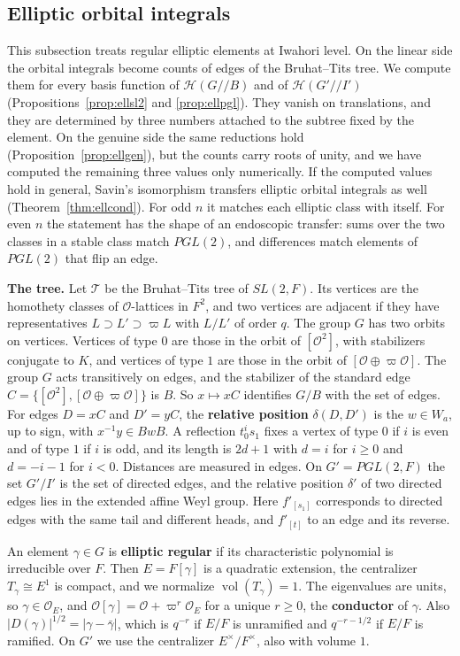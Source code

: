 \documentclass[12pt,letterpaper]{amsart}
\numberwithin{equation}{section}
\theoremstyle{definition}
\theoremstyle{remark}
\DeclareMathOperator{\vol}{vol}
\newcommand{\cO}{\mathcal{O}}
\newcommand{\cH}{\mathcal{H}}
\begin{document}
\subsection{Elliptic orbital integrals}
\label{subsec:elliptic}
This subsection treats regular elliptic elements at Iwahori level. On
the linear side the orbital integrals become counts of edges of the
Bruhat--Tits tree. We compute them for every basis function of
$\cH(G/\!/B)$ and of $\cH(G'/\!/I')$
(Propositions~\ref{prop:ellsl2} and \ref{prop:ellpgl}). They vanish on
translations, and they are determined by three numbers attached to the
subtree fixed by the element. On the genuine side the same reductions
hold (Proposition~\ref{prop:ellgen}), but the counts carry roots of
unity, and we have computed the remaining three values only
numerically. If the computed values hold in general, Savin's
isomorphism transfers elliptic orbital integrals as well
(Theorem~\ref{thm:ellcond}). For odd $n$ it matches each elliptic
class with itself. For even $n$ the statement has the shape of an
endoscopic transfer: sums over the two classes in a stable class match
$PGL(2)$, and differences match elements of $PGL(2)$ that flip an
edge.

\medskip\noindent\textbf{The tree.} Let $\mathcal T$ be the
Bruhat--Tits tree of $SL(2,F)$. Its vertices are the homothety classes
of $\cO$-lattices in $F^2$, and two vertices are adjacent if they have
representatives $L\supset L'\supset\varpi L$ with $L/L'$ of order $q$.
The group $G$ has two orbits on vertices. Vertices of type $0$ are
those in the orbit of $[\cO^2]$, with stabilizers conjugate to $K$, and
vertices of type $1$ are those in the orbit of $[\cO\oplus\varpi\cO]$.
The group $G$ acts transitively on edges, and the stabilizer of the
standard edge $C=\{[\cO^2],[\cO\oplus\varpi\cO]\}$ is $B$. So $x\mapsto
xC$ identifies $G/B$ with the set of edges. For edges $D=xC$ and
$D'=yC$, the \textbf{relative position} $\delta(D,D')$ is the $w\in
W_a$, up to sign, with $x^{-1}y\in BwB$. A reflection $t_0^is_1$ fixes
a vertex of type $0$ if $i$ is even and of type $1$ if $i$ is odd, and
its length is $2d+1$ with $d=i$ for $i\geq0$ and $d=-i-1$ for $i<0$.
Distances are measured in edges. On $G'=PGL(2,F)$ the set $G'/I'$ is
the set of directed edges, and the relative position $\delta'$ of two
directed edges lies in the extended affine Weyl group. Here $f'_{[s_1]}$
corresponds to directed edges with the same tail and different heads,
and $f'_{[t]}$ to an edge and its reverse.

An element $\gamma\in G$ is \textbf{elliptic regular} if its
characteristic polynomial is irreducible over $F$. Then $E=F[\gamma]$ is
a quadratic extension, the centralizer $T_\gamma\cong E^1$ is compact,
and we normalize $\vol(T_\gamma)=1$. The eigenvalues are units, so
$\gamma\in\cO_E$, and $\cO[\gamma]=\cO+\varpi^r\cO_E$ for a unique
$r\geq0$, the \textbf{conductor} of $\gamma$. Also
$|D(\gamma)|^{1/2}=|\gamma-\bar\gamma|$, which is $q^{-r}$ if $E/F$ is
unramified and $q^{-r-1/2}$ if $E/F$ is ramified. On $G'$ we use the
centralizer $E^\times/F^\times$, also with volume $1$.
\end{document}
